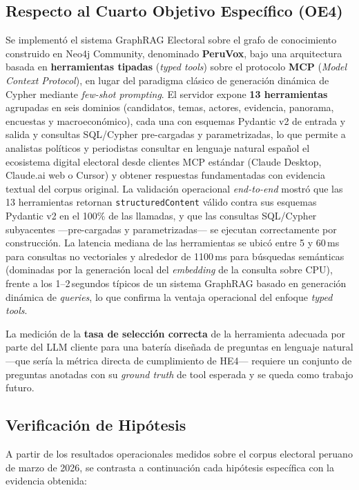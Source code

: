 \subsection*{Respecto al Cuarto Objetivo Específico (OE4)}
Se implementó el sistema GraphRAG Electoral sobre el grafo de conocimiento
construido en Neo4j Community, denominado \textbf{PeruVox}, bajo una arquitectura
basada en \textbf{herramientas tipadas} (\textit{typed tools}) sobre el protocolo
\textbf{MCP} (\textit{Model Context Protocol}), en lugar del paradigma clásico de
generación dinámica de Cypher mediante \textit{few-shot prompting}. El servidor
expone \textbf{13 herramientas} agrupadas en seis dominios (candidatos, temas,
actores, evidencia, panorama, encuestas y macroeconómico), cada una con esquemas
Pydantic v2 de entrada y salida y consultas SQL/Cypher pre-cargadas y
parametrizadas, lo que permite a analistas políticos y periodistas consultar en
lenguaje natural español el ecosistema digital electoral desde clientes MCP
estándar (Claude Desktop, Claude.ai web o Cursor) y obtener respuestas
fundamentadas con evidencia textual del corpus original. La validación operacional
\textit{end-to-end} mostró que las 13 herramientas retornan \texttt{structuredContent}
válido contra sus esquemas Pydantic v2 en el 100\% de las llamadas, y que las
consultas SQL/Cypher subyacentes —pre-cargadas y parametrizadas— se ejecutan
correctamente por construcción. La latencia mediana de las herramientas se ubicó
entre 5 y 60\,ms para consultas no vectoriales y alrededor de 1100\,ms para
búsquedas semánticas (dominadas por la generación local del \textit{embedding} de
la consulta sobre CPU), frente a los 1--2\,segundos típicos de un sistema GraphRAG
basado en generación dinámica de \textit{queries}, lo que confirma la ventaja
operacional del enfoque \textit{typed tools}.

La medición de la \textbf{tasa de selección correcta} de la herramienta adecuada
por parte del LLM cliente para una batería diseñada de preguntas en lenguaje
natural —que sería la métrica directa de cumplimiento de HE4— requiere un
conjunto de preguntas anotadas con su \textit{ground truth} de tool esperada y se
queda como trabajo futuro.

\subsection*{Verificación de Hipótesis}

A partir de los resultados operacionales medidos sobre el corpus electoral
peruano de marzo de 2026, se contrasta a continuación cada hipótesis específica
con la evidencia obtenida:

